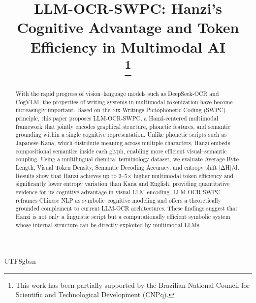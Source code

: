 \documentclass[conference]{IEEEtran}
\begin{document}
\begin{CJK*}{UTF8}{gbsn}%

\title{LLM-OCR-SWPC: Hanzi’s Cognitive Advantage and Token Efficiency in Multimodal AI\\

\thanks{This work has been partially supported by the Brazilian National Council for Scientific and Technological Development (CNPq).}
}

\author{
\and



}


\maketitle

\begin{abstract}
With the rapid progress of vision–language models such as DeepSeek-OCR and CogVLM, the properties of writing systems in multimodal tokenization have become increasingly important. Based on the Six-Writings Pictophonetic Coding (SWPC) principle, this paper proposes LLM-OCR-SWPC, a Hanzi-centered multimodal framework that jointly encodes graphical structure, phonetic features, and semantic grounding within a single cognitive representation. Unlike phonetic scripts such as Japanese Kana, which distribute meaning across multiple characters, Hanzi embeds compositional semantics inside each glyph, enabling more efficient visual–semantic coupling. Using a multilingual chemical terminology dataset, we evaluate Average Byte Length, Visual Token Density, Semantic Decoding Accuracy, and entropy shift |ΔH|/d. Results show that Hanzi achieves up to 2–5× higher multimodal token efficiency and significantly lower entropy variation than Kana and English, providing quantitative evidence for its cognitive advantage in visual LLM encoding. LLM-OCR-SWPC reframes Chinese NLP as symbolic–cognitive modeling and offers a theoretically grounded complement to current LLM-OCR architectures. These findings suggest that Hanzi is not only a linguistic script but a computationally efficient symbolic system whose internal structure can be directly exploited by multimodal LLMs.
\end{abstract}


\end{CJK*}
\end{document}
